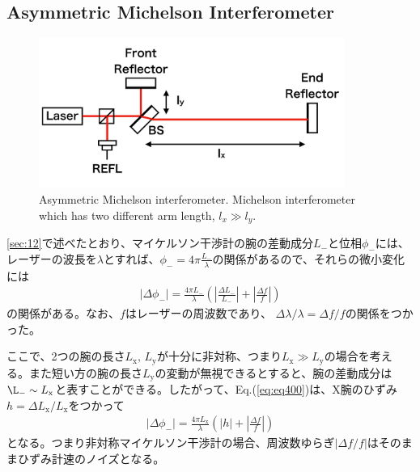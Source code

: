 \subsection{Asymmetric Michelson Interferometer}
\begin{figure}[h]
  \centering
  \includegraphics[width=10.0cm]{./img_chap4/img401.png}
  \caption{Asymmetric Michelson interferometer. Michelson interferometer which has two different arm length, $l_x\gg{l_y}$.} \label{img:img401}
\end{figure}

\cref{sec:12}で述べたとおり、マイケルソン干渉計の腕の差動成分${L_{-}}$と位相${\phi_{-}}$には、レーザーの波長を$\lambda$とすれば、${\phi}_{-} = 4\pi\frac{{L_{-}}}{\lambda}$の関係があるので、それらの微小変化には
\begin{eqnarray}  
  \left|\Delta \phi_{-}\right| = \frac{4\pi{L_{-}}}{\lambda}\left( \left|\frac{\Delta L_{-}}{L_{-}}\right| + \left|\frac{\Delta f}{f}\right|\right) \label{eq:eq400}
\end{eqnarray}
の関係がある。なお、$f$はレーザーの周波数であり、 $\Delta{\lambda}/\lambda = \Delta{f}/f$の関係をつかった。

ここで、2つの腕の長さ$L_{\mathrm{x}},\,L_{\mathrm{y}}$が十分に非対称、つまり$L_{\mathrm{x}} \gg L_{\mathrm{y}}$の場合を考える。また短い方の腕の長さ$L_{\mathrm{y}}$の変動が無視できるとすると、腕の差動成分は$\L_{-}\sim{L_{\mathrm{x}}}$と表すことができる。したがって、Eq.(\ref{eq:eq400})は、X腕のひずみ$h=\Delta{L_{\mathrm{x}}}/L_{\mathrm{x}}$をつかって
\begin{eqnarray}  
  \left|\Delta \phi_{-}\right| = \frac{4\pi{L_{\mathrm{x}}}}{\lambda}\left( \left|h\right|  + \left|\frac{\Delta f}{f}\right|\right) \label{eq:eq400_a}
\end{eqnarray}
となる。つまり非対称マイケルソン干渉計の場合、周波数ゆらぎ$|\Delta{f}/f|$はそのままひずみ計速のノイズとなる。


